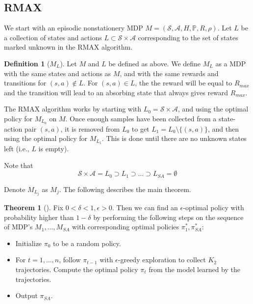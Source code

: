 \documentclass[12pt, letterpaper]{article}
\theoremstyle{definition}
\newtheorem*{defn}{Definition}
\newtheorem*{thm}{Theorem}
\theoremstyle{remark}
\begin{document}
\subsection{RMAX}

We start with an episodic nonstationery MDP \(M = (\mathcal{S}, \mathcal{A}, H, \mathbb{P}, R, \rho)\). Let \(L\) be a collection of states and actions \(L \subset \mathcal{S} \times \mathcal{A}\) corresponding to the set of states marked unknown in the RMAX algorithm.

\begin{defn}[\(M_L\)]
    Let \(M\) and \(L\) be defined as above. We define \(M_L\) as a MDP with the same states and actions as \(M\), and with the same rewards and transitions for \((s, a) \notin L\). For \((s, a) \in L\), the the reward will be equal to \(R_{max}\) and the transition will lead to an absorbing state that always gives reward \(R_{max}\).
\end{defn}

The RMAX algorithm works by starting with \(L_0 = \mathcal{S} \times \mathcal{A}\), and using the optimal policy for \(M_{L_0}\) on \(M\). Once enough samples have been collected from a state-action pair \((s, a)\), it is removed from \(L_0\) to get \(L_1 = L_0 \setminus \{(s, a)\}\), and then using the optimal policy for \(M_{L_1}\). This is done until there are no unknown states left (i.e., \(L\) is empty).

Note that
\[\mathcal{S} \times \mathcal{A} = L_0 \supset L_1 \supset \ldots \supset L_{SA} = \emptyset\]

Denote \(M_{L_j}\) as \(M_j\). The following describes the main theorem.

\begin{thm}[]
    Fix \(0 < \delta < 1, \epsilon > 0\). Then we can find an \(\epsilon\)-optimal policy with probability higher than \(1 - \delta\) by performing the following steps on the sequence of MDP's \(M_1, \ldots, M_{SA}\) with corresponding optimal policies \(\pi^*_{1}, \pi^{*}_{SA}\):

    \begin{itemize}
        \item Initialize \(\pi_0\) to be a random policy.
        \item For \(t = 1, \ldots, n\), follow \(\pi_{t-1}\) with \(\epsilon\)-greedy exploration to collect \(K_2\) trajectories. Compute the optimal policy \(\pi_t\) from the model learned by the trajectories.
        \item Output \(\pi_{SA}\).
    \end{itemize}
    
\end{thm}
\end{document}
